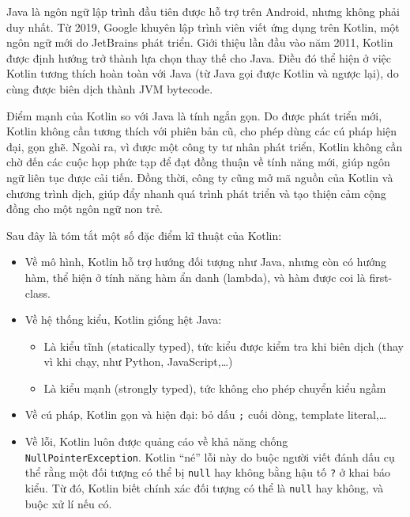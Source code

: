 \documentclass[../../thesis]{subfiles}
\begin{document}
Java là ngôn ngữ lập trình đầu tiên được hỗ trợ trên Android, nhưng không phải
duy nhất. Từ 2019, Google khuyên lập trình viên viết ứng dụng trên Kotlin, một
ngôn ngữ mới do JetBrains phát triển. Giới thiệu lần đầu vào năm 2011, Kotlin
được định hướng trở thành lựa chọn thay thế cho Java. Điều đó thể hiện ở việc
Kotlin tương thích hoàn toàn với Java (từ Java gọi được Kotlin và ngược lại), do
cùng được biên dịch thành JVM bytecode.

Điểm mạnh của Kotlin so với Java là tính ngắn gọn. Do được phát triển mới,
Kotlin không cần tương thích với phiên bản cũ, cho phép dùng các cú pháp hiện
đại, gọn ghẽ. Ngoài ra, vì được một công ty tư nhân phát triển, Kotlin không cần
chờ đến các cuộc họp phức tạp để đạt đồng thuận về tính năng mới, giúp ngôn ngữ
liên tục được cải tiến. Đồng thời, công ty cũng mở mã nguồn của Kotlin và chương
trình dịch, giúp đẩy nhanh quá trình phát triển và tạo thiện cảm cộng đồng cho
một ngôn ngữ non trẻ.

Sau đây là tóm tắt một số đặc điểm kĩ thuật của Kotlin:

\begin{itemize}
    \item
        Về mô hình, Kotlin hỗ trợ hướng đối tượng như Java, nhưng còn có hướng
        hàm, thể hiện ở tính năng hàm ẩn danh (lambda), và hàm được coi là
        first-class.
    \item
        Về hệ thống kiểu, Kotlin giống hệt Java:

        \begin{itemize}
            \item
                Là kiểu tĩnh (statically typed), tức kiểu được kiểm tra khi biên
                dịch (thay vì khi chạy, như Python, JavaScript,\ldots)
            \item
                Là kiểu mạnh (strongly typed), tức không cho phép chuyển kiểu
                ngầm
        \end{itemize}
    \item
        Về cú pháp, Kotlin gọn và hiện đại: bỏ dấu \texttt{;} cuối dòng,
        template literal,\ldots{}
    \item
        Về lỗi, Kotlin luôn được quảng cáo về khả năng chống
        \texttt{NullPointerException}. Kotlin ``né'' lỗi này do buộc người viết
        đánh dấu cụ thể rằng một đối tượng có thể bị \texttt{null} hay không
        bằng hậu tố \texttt{?} ở khai báo kiểu. Từ đó, Kotlin biết chính xác đối
        tượng có thể là \texttt{null} hay không, và buộc xử lí nếu có.
\end{itemize}
\end{document}
